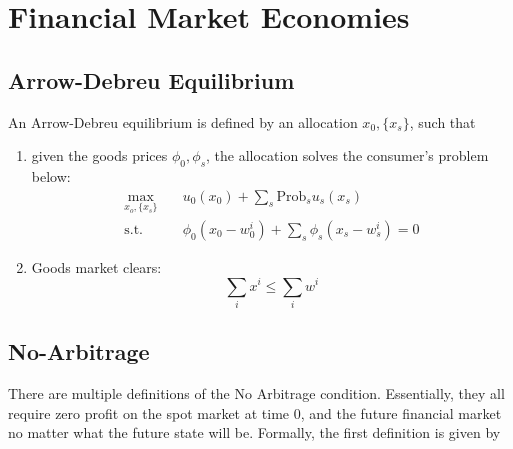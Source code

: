 \chapter{Financial Market Economies}


\section{Arrow-Debreu Equilibrium}
\begin{definition}
  An Arrow-Debreu equilibrium is defined by an allocation $x_0, \{x_s\}$,
  such that 
  \begin{enumerate}
    \item given the goods prices $\phi_0, \phi_s$, the allocation solves the 
    consumer's problem below:
    \begin{align*}
      \max_{x_o, \{x_s\}} \quad & u_0(x_0) + \sum_{s} \text{Prob}_s u_s(x_s) \\
      \text{s.t.} \quad & \phi_0 (x_0 - w_0^i) + \sum_s \phi_s (x_s - w_s^i) = 0
    \end{align*}
    \item Goods market clears:
    \[
    \sum_i x^i \leq \sum_i w^i
    \]
\end{enumerate}
\end{definition}









\section{No-Arbitrage}

There are multiple definitions of the No Arbitrage condition.
Essentially, they all require zero profit on the spot market at time 0, 
and the future financial market no matter what the future state will be.
Formally, the first definition is given by

